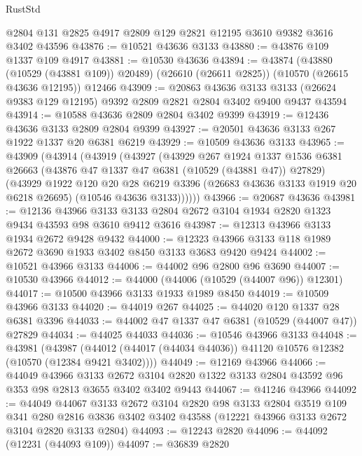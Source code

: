 \begin{lexlean}{RustStd}
\begin{coremodule}
    @2804
    @131
    @2825
    @4917
    @2809
    @129
    @2821
    @12195
    @3610
    @9382
    @3616
    @3402
    @43596
@43876 := @10521 @43636 @3133
@43880 := @43876 @109 @1337 @109 @4917
@43881 := @10530 @43636
@43894 := @43874
    (@43880 (@10529 (@43881 @109)) @20489)
    (@26610 (@26611 @2825))
    (@10570 (@26615 @43636 @12195))
    @12466
@43909 := @20863
    @43636
    @3133
    @3133
    (@26624 @9383 @129 @12195)
    @9392
    @2809
    @2821
    @2804
    @3402
    @9400
    @9437
    @43594
@43914 := @10588 @43636 @2809 @2804 @3402 @9399
@43919 := @12436 @43636 @3133 @2809 @2804 @9399
@43927 := @20501 @43636 @3133 @267 @1922 @1337 @20 @6381 @6219
@43929 := @10509 @43636 @3133
@43965 := @43909
    (@43914
      (@43919
        (@43927
          (@43929
            @267
            @1924
            @1337
            @1536
            @6381
            @26663
            (@43876 @47 @1337 @47 @6381 (@10529 (@43881 @47)) @27829)
            (@43929
              @1922
              @120
              @20
              @28
              @6219
              @3396
              (@26683 @43636 @3133 @1919 @20 @6218 @26695)
              (@10546 @43636 @3133))))))
@43966 := @20687 @43636
@43981 := @12136
    @43966
    @3133
    @3133
    @2804
    @2672
    @3104
    @1934
    @2820
    @1323
    @9434
    @43593
    @98
    @3610
    @9412
    @3616
@43987 := @12313 @43966 @3133 @1934 @2672 @9428 @9432
@44000 := @12323 @43966 @3133 @118 @1989 @2672 @3690 @1933 @3402 @8450 @3133 @3683 @9420 @9424
@44002 := @10521 @43966 @3133
@44006 := @44002 @96 @2800 @96 @3690
@44007 := @10530 @43966
@44012 := @44000 (@44006 (@10529 (@44007 @96)) @12301)
@44017 := @10500 @43966 @3133 @1933 @1989 @8450
@44019 := @10509 @43966 @3133
@44020 := @44019 @267
@44025 := @44020 @120 @1337 @28 @6381 @3396
@44033 := @44002 @47 @1337 @47 @6381 (@10529 (@44007 @47)) @27829
@44034 := @44025 @44033
@44036 := @10546 @43966 @3133
@44048 := @43981
    (@43987 (@44012 (@44017 (@44034 @44036)) @41120 @10576 @12382 (@10570 (@12384 @9421 @3402))))
@44049 := @12169 @43966
@44066 := @44049
    @43966
    @3133
    @2672
    @3104
    @2820
    @1322
    @3133
    @2804
    @43592
    @96
    @353
    @98
    @2813
    @3655
    @3402
    @3402
    @9443
@44067 := @41246 @43966
@44092 := @44049
    @44067
    @3133
    @2672
    @3104
    @2820
    @98
    @3133
    @2804
    @3519
    @109
    @341
    @280
    @2816
    @3836
    @3402
    @3402
    @43588
    (@12221 @43966 @3133 @2672 @3104 @2820 @3133 @2804)
@44093 := @12243 @2820
@44096 := @44092 (@12231 (@44093 @109))
@44097 := @36839 @2820

\end{coremodule}
\end{lexlean}
